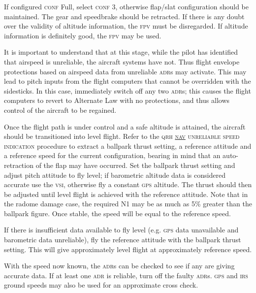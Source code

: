 \documentclass[a5paper,11pt,twoside]{book}
\newcommand{\ac}[1]{{\scshape\MakeLowercase{#1}}}
\newcommand{\ecam}[2]{{\ac{\uline{#1} #2}}}
\begin{document}
If configured \ac{CONF} Full, select \ac{CONF} 3, otherwise flap/slat
configuration should be maintained. The gear and speedbrake should be
retracted. If there is any doubt over the validity of altitude information, the
\ac{FPV} must be disregarded. If altitude information is definitely good, the
\ac{FPV} may be used.

It is important to understand that at this stage, while the pilot has identified
that airspeed is unreliable, the aircraft systems have not. Thus flight envelope
protections based on airspeed data from unreliable \ac{ADR}s may activate. This
may lead to pitch inputs from the flight computers that cannot be overridden
with the sidesticks. In this case, immediately switch off any two \ac{ADR}s;
this causes the flight computers to revert to Alternate Law with no protections,
and thus allows control of the aircraft to be regained.

Once the flight path is under control and a safe altitude is attained, the
aircraft should be transitioned into level flight. Refer to the \ac{QRH}
\ecam{NAV}{Unreliable Speed Indication} procedure to extract a ballpark thrust
setting, a reference attitude and a reference speed for the current
configuration, bearing in mind that an auto-retraction of the flap may have
occurred. Set the ballpark thrust setting and adjust pitch attitude to fly
level; if barometric altitude data is considered accurate use the \ac{VSI},
otherwise fly a constant \ac{GPS} altitude. The thrust should then be adjusted
until level flight is achieved with the reference attitude. Note that in the
radome damage case, the required N1 may be as much as 5\% greater than the
ballpark figure. Once stable, the speed will be equal to the reference speed.

If there is insufficient data available to fly level (e.g. \ac{GPS} data
unavailable and barometric data unreliable), fly the reference attitude with the
ballpark thrust setting. This will give approximately level flight at
approximately reference speed.

With the speed now known, the \ac{ADR}s can be checked to see if any are giving
accurate data. If at least one \ac{ADR} is reliable, turn off the faulty
\ac{ADR}s. \ac{GPS} and \ac{IRS} ground speeds may also be used for an
approximate cross check.
\end{document}
